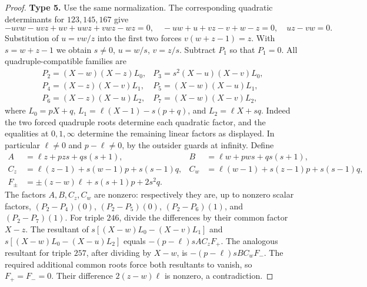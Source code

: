 \begin{proof}
\smallskip\noindent\textbf{Type 5.}
Use the same normalization.  The corresponding quadratic determinants
for $123,145,167$ give
\[
 -uvw-uvz+uv+uwz+vwz-wz=0,
 \quad -uw+u+vz-v+w-z=0,\quad uz-vw=0.
\]
Substitution of $u=vw/z$ into the first two forces
$v(w+z-1)=z$.  With $s=w+z-1$ we obtain
$s\ne0$, $u=w/s$, $v=z/s$.
Subtract $P_1$ so that $P_1=0$.  All quadruple-compatible families are
\[
\begin{array}{ll}
 P_2=(X-w)(X-z)L_0,&P_3=s^2(X-u)(X-v)L_0,\\
 P_4=(X-z)(X-v)L_1,&P_5=(X-w)(X-u)L_1,\\
 P_6=(X-z)(X-u)L_2,&P_7=(X-w)(X-v)L_2,
\end{array}
\]
where $L_0=pX+q$, $L_1=\ell(X-1)-s(p+q)$, and
$L_2=\ell X+sq$.  Indeed the two forced quadruple roots determine each
quadratic factor, and the equalities at $0,1,\infty$ determine the
remaining linear factors as displayed.  In particular $\ell\ne0$ and
$p-\ell\ne0$, by the outsider guards at infinity.
Define
\begin{align*}
 A&=\ell z+pzs+qs(s+1),& B&=\ell w+pws+qs(s+1),\\
 C_z&=\ell(z-1)+s(w-1)p+s(s-1)q,
 &C_w&=\ell(w-1)+s(z-1)p+s(s-1)q,\\
 F_\pm&=\pm(z-w)\ell+s(s+1)p+2s^2q.
\end{align*}
The factors $A,B,C_z,C_w$ are nonzero: respectively they are, up to
nonzero scalar factors, $(P_2-P_4)(0)$, $(P_2-P_5)(0)$,
$(P_2-P_6)(1)$, and $(P_2-P_7)(1)$.
For triple $246$, divide the differences by their common factor $X-z$.
The resultant of
$s[(X-w)L_0-(X-v)L_1]$ and
$s[(X-w)L_0-(X-u)L_2]$ equals
$-(p-\ell)sAC_zF_+$.  The analogous resultant for triple $257$, after
dividing by $X-w$, is $-(p-\ell)sBC_wF_-$.
The required additional common roots force both resultants to vanish,
so $F_+=F_-=0$.  Their difference $2(z-w)\ell$ is nonzero, a contradiction.


\end{proof}
